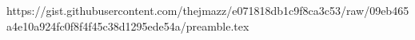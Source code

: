 https://gist.githubusercontent.com/thejmazz/e071818db1c9f8ca3c53/raw/09eb465a4e10a924fc0f8f4f45c38d1295ede54a/preamble.tex